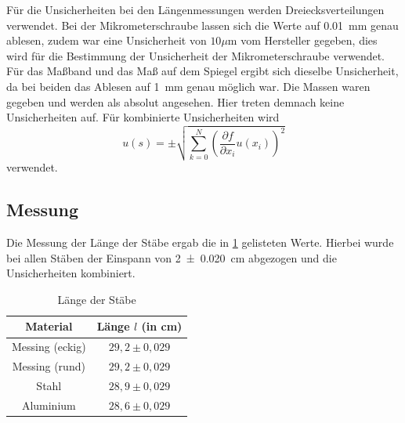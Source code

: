 	Für die Unsicherheiten bei den Längenmessungen werden Dreiecksverteilungen verwendet. Bei der Mikrometerschraube lassen sich die Werte auf \SI{0,01}{\mm} genau ablesen, zudem war eine Unsicherheit von $10\mu $m vom Hersteller gegeben, dies wird für die Bestimmung der Unsicherheit der Mikrometerschraube verwendet. Für das Maßband und das Maß auf dem Spiegel ergibt sich dieselbe Unsicherheit, da bei beiden das Ablesen auf \SI{1}{\mm} genau möglich war.
	Die Massen waren gegeben und werden als absolut angesehen. Hier treten demnach keine Unsicherheiten auf.
	Für kombinierte Unsicherheiten wird
	\begin{equation}
	u(s) = \pm \sqrt{\sum_{k=0}^{N}\left( \frac{\partial f}{\partial x_i}u(x_i)\right) ^2} \label{eq:kombUnsicherheit}
	\end{equation}
	verwendet.
	
	\subsection{Messung}
	
	Die Messung der Länge der Stäbe ergab die in \cref{tab:Stablängen} gelisteten Werte. Hierbei wurde bei allen Stäben der Einspann von \SI{2+-0,020}{\cm} abgezogen und die Unsicherheiten kombiniert.
	\begin{table}[h]
		\caption{Länge der Stäbe}
		\centering
		\label{tab:Stablängen}
		\begin{tabular}{c|c}
			{Material} & {Länge $l$ (in cm)}\\
			\hline
			{Messing (eckig)} & {$29,2\pm 0,029$}\\
			{Messing (rund)} &  {$29,2\pm 0,029$}\\
			{Stahl} & {$28,9\pm 0,029$}\\
			{Aluminium} & {$28,6\pm 0,029$}\\		
		\end{tabular}
	\end{table}
	

